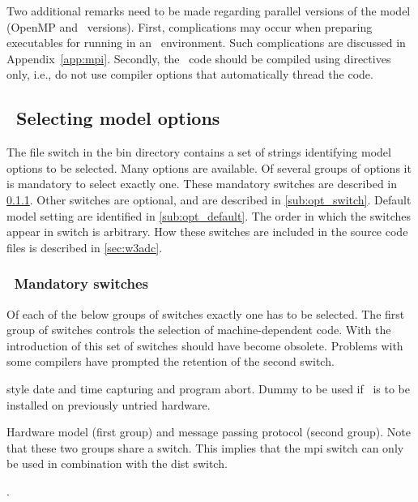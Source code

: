 \vspace{\baselineskip} 
\noindent 
Two additional remarks need to be made regarding parallel versions of the
model (OpenMP and \mpi\ versions). First, complications may occur when
preparing executables for running in an \mpi\ environment. Such complications
are discussed in Appendix~\ref{app:mpi}. Secondly, the \omp\ code should be
compiled using directives only, i.e., do not use compiler options that
automatically thread the code.


\pb
\vssub
\subsection{~Selecting model options} \label{sec:switches}
\vssub

The file {\file switch} in the {\file bin} directory contains a set of strings
identifying model options to be selected. Many options are available. Of
several groups of options it is mandatory to select exactly one. These
mandatory switches are described in \para\ref{sub:man_switch}. Other switches
are optional, and are described in \para\ref{sub:opt_switch}. Default model
setting are identified in \para\ref{sub:opt_default}. The order in which the
switches appear in {\file switch} is arbitrary. How these switches are
included in the source code files is described in \para\ref{sec:w3adc}.


\vsssub
\subsubsection{~Mandatory switches} \label{sub:man_switch}
\vsssub

Of each of the below groups of switches exactly one has to be selected. The
first group of switches controls the selection of machine-dependent code. With
the introduction of  this set of switches should have become
obsolete. Problems with some compilers have prompted the retention of the
second switch.
\begin{slist}
 { style date and time capturing and program
           abort.}
 {Dummy to be used if \ws\ is to be installed on
           previously untried hardware.}
\end{slist}

\noindent
Hardware model (first group) and message passing protocol (second group). Note
that these two groups share a switch. This implies that the {\sc mpi} switch
can only be used in combination with the {\sc dist} switch.
\begin{slist}
.
\end{slist}

